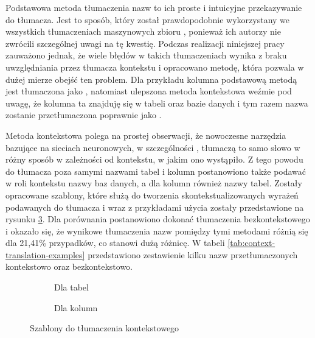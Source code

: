 Podstawowa metoda tłumaczenia nazw to ich proste i intuicyjne przekazywanie do tłumacza. Jest to sposób, który został prawdopodobnie wykorzystany we wszystkich tłumaczeniach maszynowych zbioru , ponieważ ich autorzy nie zwrócili szczególnej uwagi na tę kwestię. Podczas realizacji niniejszej pracy zauważono jednak, że wiele błędów w takich tłumaczeniach wynika z braku uwzględniania przez tłumacza kontekstu i opracowano metodę, która pozwala w dużej mierze obejść ten problem. Dla przykładu kolumna  podstawową metodą jest tłumaczona jako , natomiast ulepszona metoda kontekstowa weźmie pod uwagę, że kolumna ta znajduję się w tabeli  oraz bazie danych  i tym razem nazwa zostanie przetłumaczona poprawnie jako .

Metoda kontekstowa polega na prostej obserwacji, że nowoczesne narzędzia bazujące na sieciach neuronowych, w szczególności , tłumaczą to samo słowo w różny sposób w zależności od kontekstu, w jakim ono wystąpiło. Z tego powodu do tłumacza poza samymi nazwami tabel i kolumn postanowiono także podawać w roli kontekstu nazwy baz danych, a dla kolumn również nazwy tabel. Zostały opracowane szablony, które służą do tworzenia skontekstualizowanych wyrażeń podawanych do tłumacza i wraz z przykładami użycia zostały przedstawione na rysunku \ref{fig:translation-in-context}. Dla porównania postanowiono dokonać tłumaczenia bezkontekstowego i okazało się, że wynikowe tłumaczenia nazw pomiędzy tymi metodami różnią się dla 21,41\% przypadków, co stanowi dużą różnicę. W tabeli \ref{tab:context-translation-examples} przedstawiono zestawienie kilku nazw przetłumaczonych kontekstowo oraz bezkontekstowo.

\begin{figure}[ht!]
\centering
\begin{subfigure}{0.49\textwidth}
    
    \caption{Dla tabel}
    \label{fig:first}
\end{subfigure}
\hfill
\begin{subfigure}{0.49\textwidth}
    
    \caption{Dla kolumn}
    \label{fig:second}
\end{subfigure}
\caption{Szablony do tłumaczenia kontekstowego}
\label{fig:translation-in-context}
\end{figure}

